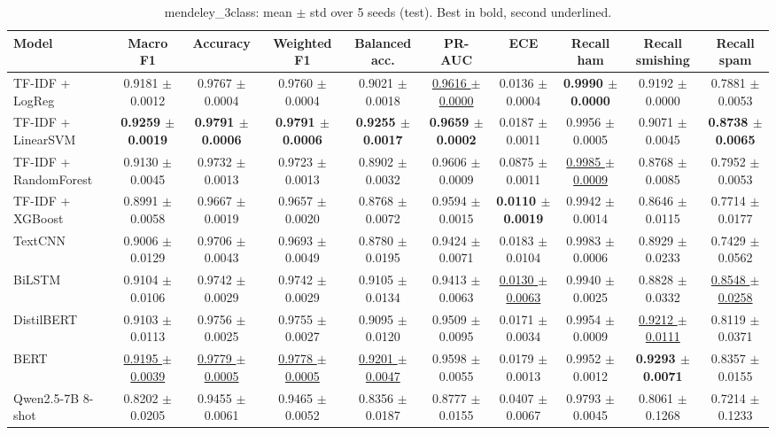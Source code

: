 \begin{table}[t]
\centering
\small
\caption{mendeley\_3class: mean $\pm$ std over 5 seeds (test). Best in bold, second underlined.}
\label{tab:mendeley_3class}
\begin{tabular}{lccccccccc}
\toprule
Model & Macro F1 & Accuracy & Weighted F1 & Balanced acc. & PR-AUC & ECE & Recall ham & Recall smishing & Recall spam \\
\midrule
TF-IDF + LogReg & 0.9181 $\pm$ 0.0012 & 0.9767 $\pm$ 0.0004 & 0.9760 $\pm$ 0.0004 & 0.9021 $\pm$ 0.0018 & \underline{0.9616 $\pm$ 0.0000} & 0.0136 $\pm$ 0.0004 & \textbf{0.9990 $\pm$ 0.0000} & 0.9192 $\pm$ 0.0000 & 0.7881 $\pm$ 0.0053 \\
TF-IDF + LinearSVM & \textbf{0.9259 $\pm$ 0.0019} & \textbf{0.9791 $\pm$ 0.0006} & \textbf{0.9791 $\pm$ 0.0006} & \textbf{0.9255 $\pm$ 0.0017} & \textbf{0.9659 $\pm$ 0.0002} & 0.0187 $\pm$ 0.0011 & 0.9956 $\pm$ 0.0005 & 0.9071 $\pm$ 0.0045 & \textbf{0.8738 $\pm$ 0.0065} \\
TF-IDF + RandomForest & 0.9130 $\pm$ 0.0045 & 0.9732 $\pm$ 0.0013 & 0.9723 $\pm$ 0.0013 & 0.8902 $\pm$ 0.0032 & 0.9606 $\pm$ 0.0009 & 0.0875 $\pm$ 0.0011 & \underline{0.9985 $\pm$ 0.0009} & 0.8768 $\pm$ 0.0085 & 0.7952 $\pm$ 0.0053 \\
TF-IDF + XGBoost & 0.8991 $\pm$ 0.0058 & 0.9667 $\pm$ 0.0019 & 0.9657 $\pm$ 0.0020 & 0.8768 $\pm$ 0.0072 & 0.9594 $\pm$ 0.0015 & \textbf{0.0110 $\pm$ 0.0019} & 0.9942 $\pm$ 0.0014 & 0.8646 $\pm$ 0.0115 & 0.7714 $\pm$ 0.0177 \\
TextCNN & 0.9006 $\pm$ 0.0129 & 0.9706 $\pm$ 0.0043 & 0.9693 $\pm$ 0.0049 & 0.8780 $\pm$ 0.0195 & 0.9424 $\pm$ 0.0071 & 0.0183 $\pm$ 0.0104 & 0.9983 $\pm$ 0.0006 & 0.8929 $\pm$ 0.0233 & 0.7429 $\pm$ 0.0562 \\
BiLSTM & 0.9104 $\pm$ 0.0106 & 0.9742 $\pm$ 0.0029 & 0.9742 $\pm$ 0.0029 & 0.9105 $\pm$ 0.0134 & 0.9413 $\pm$ 0.0063 & \underline{0.0130 $\pm$ 0.0063} & 0.9940 $\pm$ 0.0025 & 0.8828 $\pm$ 0.0332 & \underline{0.8548 $\pm$ 0.0258} \\
DistilBERT & 0.9103 $\pm$ 0.0113 & 0.9756 $\pm$ 0.0025 & 0.9755 $\pm$ 0.0027 & 0.9095 $\pm$ 0.0120 & 0.9509 $\pm$ 0.0095 & 0.0171 $\pm$ 0.0034 & 0.9954 $\pm$ 0.0009 & \underline{0.9212 $\pm$ 0.0111} & 0.8119 $\pm$ 0.0371 \\
BERT & \underline{0.9195 $\pm$ 0.0039} & \underline{0.9779 $\pm$ 0.0005} & \underline{0.9778 $\pm$ 0.0005} & \underline{0.9201 $\pm$ 0.0047} & 0.9598 $\pm$ 0.0055 & 0.0179 $\pm$ 0.0013 & 0.9952 $\pm$ 0.0012 & \textbf{0.9293 $\pm$ 0.0071} & 0.8357 $\pm$ 0.0155 \\
Qwen2.5-7B 8-shot & 0.8202 $\pm$ 0.0205 & 0.9455 $\pm$ 0.0061 & 0.9465 $\pm$ 0.0052 & 0.8356 $\pm$ 0.0187 & 0.8777 $\pm$ 0.0155 & 0.0407 $\pm$ 0.0067 & 0.9793 $\pm$ 0.0045 & 0.8061 $\pm$ 0.1268 & 0.7214 $\pm$ 0.1233 \\
\bottomrule
\end{tabular}
\end{table}
